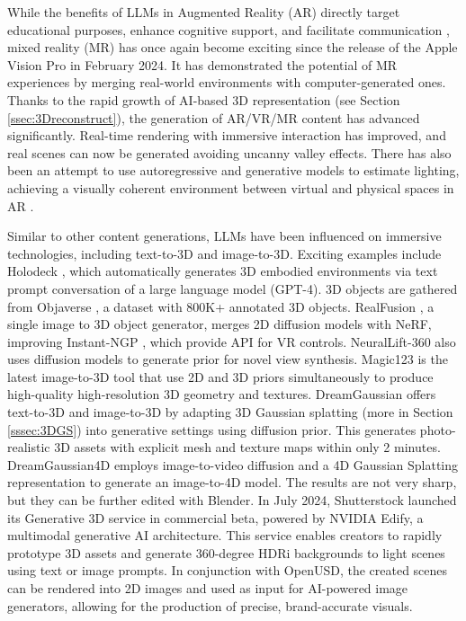 \documentclass[11pt,a4paper]{article}
\begin{document}
While the benefits of LLMs in Augmented Reality (AR) directly target educational purposes, enhance cognitive support, and facilitate communication \cite{XU2025103402}, mixed reality (MR) has once again become exciting since the release of the Apple Vision Pro in February 2024. It has demonstrated the potential of MR experiences by merging real-world environments with computer-generated ones. Thanks to the rapid growth of AI-based 3D representation (see Section \ref{ssec:3Dreconstruct}), the generation of AR/VR/MR content has advanced significantly. Real-time rendering with immersive interaction has improved, and real scenes can now be generated avoiding uncanny valley effects. There has also been an attempt to use autoregressive and generative models to estimate lighting, achieving a visually coherent environment between virtual and physical spaces in AR \cite{zhao2024clear}.

Similar to other content generations, LLMs have been influenced on immersive technologies, including text-to-3D and image-to-3D. Exciting examples include
Holodeck \cite{yang:Holodeck:2024}, which automatically generates 3D embodied environments via text prompt conversation of a large language model (GPT-4). 3D objects are gathered from Objaverse \cite{deitke:Objaverse:2023}, a dataset with 800K+ annotated 3D objects. RealFusion \cite{Melas:RealFusion:2023}, a single image to 3D object generator, merges 2D diffusion models with NeRF, improving Instant-NGP \cite{mueller:instant:2022}, which provide API for VR controls. NeuralLift-360 \cite{Xu:NeuralLift:2023} also uses diffusion models to generate prior for novel view synthesis. Magic123 \cite{Qian:Magic123:2024} is the latest image-to-3D tool that use  2D and 3D priors simultaneously  to produce high-quality high-resolution 3D geometry and textures. DreamGaussian \cite{tang:dreamgaussian:2024} offers text-to-3D and image-to-3D by adapting 3D Gaussian splatting (more in Section \ref{sssec:3DGS}) into generative settings using diffusion prior. This generates photo-realistic 3D assets with explicit mesh and texture maps within only 2 minutes. DreamGaussian4D \cite{ren:dreamgaussian4d:2023} employs image-to-video diffusion and a 4D Gaussian Splatting representation to generate an image-to-4D model. The results are not very sharp, but they can be further edited with Blender. 
In July 2024, Shutterstock launched its Generative 3D service in commercial beta, powered by NVIDIA Edify, a multimodal generative AI architecture. This service enables creators to rapidly prototype 3D assets and generate 360-degree HDRi backgrounds to light scenes using text or image prompts. In conjunction with OpenUSD, the created scenes can be rendered into 2D images and used as input for AI-powered image generators, allowing for the production of precise, brand-accurate visuals.
\end{document}
